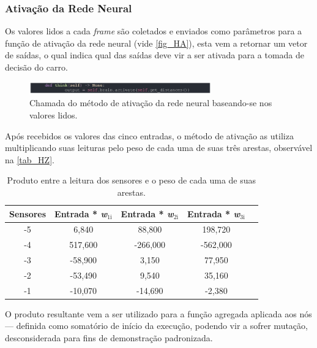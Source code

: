 \subsubsection{Ativação da Rede Neural}
Os valores lidos a cada \textit{frame} são coletados e enviados como parâmetros para a função de ativação da
rede neural (vide \autoref{fig_HA}), esta vem a retornar um vetor de saídas, o qual indica qual das saídas deve
vir a ser ativada para a tomada de decisão do carro.

\begin{figure}[htb]
        \centering
        \caption{\label{fig_HA}Chamada do método de ativação da rede neural baseando-se nos valores lidos.}
        \includegraphics[width=0.7\textwidth]{images/HA.png}
\end{figure}

Após recebidos os valores das cinco entradas, o método de ativação as utiliza multiplicando suas leituras
pelo peso de cada uma de suas três arestas, observável na \autoref{tab_HZ}.

\begin{table}[htb]
	\centering
    \caption{\label{tab_HZ}Produto entre a leitura dos sensores e o peso de cada uma de suas arestas.}
    \begin{tabular}{ccccc}
        \hline
		\textbf{Sensores} & \textbf{Entrada * \textit{w$_{\text{1i}}$}} & \textbf{Entrada * \textit{w$_{\text{2i}}$}} & \textbf{Entrada * \textit{w$_{\text{3i}}$}} \\ \hline
		-5 & 6,840  & 88,800   & 198,720    \\ \hline
		-4 & 517,600  & -266,000   & -562,000    \\ \hline
		-3 & -58,900  & 3,150   & 77,950   \\ \hline
		-2 & -53,490  & 9,540   & 35,160  \\ \hline
		-1 & -10,070  & -14,690   & -2,380   \\ \hline
    \end{tabular}
    
\end{table}

O produto resultante vem a ser utilizado para a função agregada aplicada aos nós — definida como somatório de início da execução,
podendo vir a sofrer mutação, desconsiderada para fins de demonstração padronizada. 


